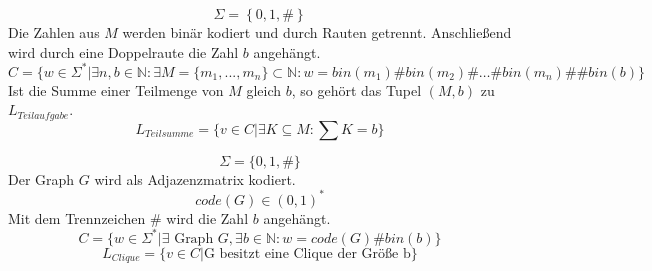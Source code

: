 \begin{exercise}{4}
\begin{subexercise}
$$\Sigma = \left\{ 0,1,\# \right\}$$
Die Zahlen aus $M$ werden bin\"ar kodiert und durch Rauten getrennt. Anschlie\ss end wird durch eine Doppelraute die Zahl $b$ angeh\"angt. 
$$C = \{w \in \Sigma^* | \exists n,b \in \mathbb{N}: \exists M = \{m_1,...,m_n\} \subset\mathbb{N}: w = bin(m_1)\#bin(m_2)\#\ldots\#bin(m_n)\#\#bin(b) \}$$
Ist die Summe einer Teilmenge von $M$ gleich $b$, so geh\"ort das Tupel $(M,b)$ zu $L_{Teilaufgabe}$.
$$L_{Teilsumme} = \{ v \in C | \exists K \subseteq M: \sum K = b\}$$
\end{subexercise}

\begin{subexercise}

$$\Sigma = \{0,1,\#\}$$
Der Graph $G$ wird als Adjazenzmatrix kodiert.
$$code(G) \in (0,1)^*$$
Mit dem Trennzeichen $\#$  wird die Zahl $b$ angeh\"angt. 
$$C = \{ w \in \Sigma^* |\exists \text{ Graph }G, \exists b \in \mathbb{N}: w=code(G)\#bin(b) \}$$
$$L_{Clique} = \{ v \in C | \text{G besitzt eine Clique der Gr\"o\ss e b} \}$$
\end{subexercise}
\end{exercise}
